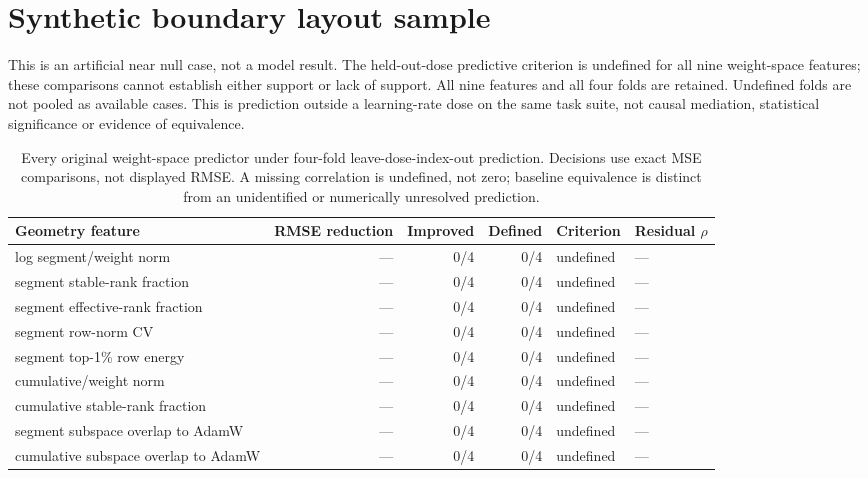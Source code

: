 \documentclass[11pt]{article}
\newcommand{\CorrectedGeometryBridgeFinding}{The held-out-dose predictive criterion is undefined for all nine weight-space features; these comparisons cannot establish either support or lack of support. All nine features and all four folds are retained. Undefined folds are not pooled as available cases. This is prediction outside a learning-rate dose on the same task suite, not causal mediation, statistical significance or evidence of equivalence.}
\newcommand{\CorrectedGeometryBridgeTable}{%
\begin{table}[t]
\centering\small
\begin{tabular}{lrrrll}\toprule
Geometry feature & RMSE reduction & Improved & Defined & Criterion & Residual $\rho$ \\
\midrule
log segment/weight norm & --- & 0/4 & 0/4 & undefined & --- \\
segment stable-rank fraction & --- & 0/4 & 0/4 & undefined & --- \\
segment effective-rank fraction & --- & 0/4 & 0/4 & undefined & --- \\
segment row-norm CV & --- & 0/4 & 0/4 & undefined & --- \\
segment top-1\% row energy & --- & 0/4 & 0/4 & undefined & --- \\
cumulative/weight norm & --- & 0/4 & 0/4 & undefined & --- \\
cumulative stable-rank fraction & --- & 0/4 & 0/4 & undefined & --- \\
segment subspace overlap to AdamW & --- & 0/4 & 0/4 & undefined & --- \\
cumulative subspace overlap to AdamW & --- & 0/4 & 0/4 & undefined & --- \\
\bottomrule\end{tabular}
\caption{Every original weight-space predictor under four-fold leave-dose-index-out prediction. Decisions use exact MSE comparisons, not displayed RMSE. A missing correlation is undefined, not zero; baseline equivalence is distinct from an unidentified or numerically unresolved prediction.}
\label{tab:corrected-bridge}
\end{table}%
}
\begin{document}
\section*{Synthetic boundary layout sample}
This is an artificial near null case, not a model result.
\CorrectedGeometryBridgeFinding
\CorrectedGeometryBridgeTable
\end{document}
